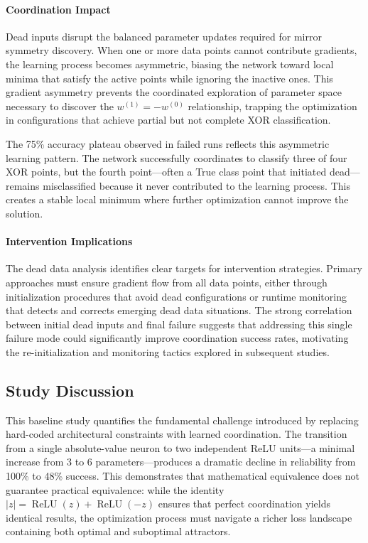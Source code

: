 \paragraph{Coordination Impact}
Dead inputs disrupt the balanced parameter updates required for mirror symmetry discovery. When one or more data points cannot contribute gradients, the learning process becomes asymmetric, biasing the network toward local minima that satisfy the active points while ignoring the inactive ones. This gradient asymmetry prevents the coordinated exploration of parameter space necessary to discover the $w^{(1)} = -w^{(0)}$ relationship, trapping the optimization in configurations that achieve partial but not complete XOR classification.

The 75\% accuracy plateau observed in failed runs reflects this asymmetric learning pattern. The network successfully coordinates to classify three of four XOR points, but the fourth point—often a True class point that initiated dead—remains misclassified because it never contributed to the learning process. This creates a stable local minimum where further optimization cannot improve the solution.

\paragraph{Intervention Implications}
The dead data analysis identifies clear targets for intervention strategies. Primary approaches must ensure gradient flow from all data points, either through initialization procedures that avoid dead configurations or runtime monitoring that detects and corrects emerging dead data situations. The strong correlation between initial dead inputs and final failure suggests that addressing this single failure mode could significantly improve coordination success rates, motivating the re-initialization and monitoring tactics explored in subsequent studies.


\subsection*{Study Discussion}

This baseline study quantifies the fundamental challenge introduced by replacing hard-coded architectural constraints with learned coordination. The transition from a single absolute-value neuron to two independent ReLU units—a minimal increase from 3 to 6 parameters—produces a dramatic decline in reliability from 100\% to 48\% success. This demonstrates that mathematical equivalence does not guarantee practical equivalence: while the identity $|z| = \operatorname{ReLU}(z) + \operatorname{ReLU}(-z)$ ensures that perfect coordination yields identical results, the optimization process must navigate a richer loss landscape containing both optimal and suboptimal attractors.

